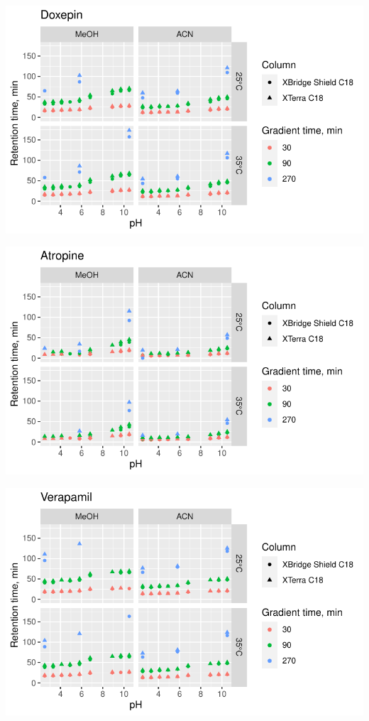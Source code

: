 \documentclass[
  letterpaper,
  DIV=11,
  numbers=noendperiod]{scrreprt}
\begin{document}
\includegraphics{index_files/figure-pdf/unnamed-chunk-4-12.pdf}

\includegraphics{index_files/figure-pdf/unnamed-chunk-4-13.pdf}

\includegraphics{index_files/figure-pdf/unnamed-chunk-4-14.pdf}
\end{document}
